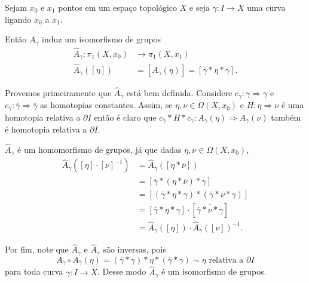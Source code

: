 \begin{prop}
    Sejam $x_0$ e $x_1$ pontos em um espaço topológico $X$ e seja $\gamma: I \to X$ uma curva ligando $x_0$ a $x_1$.
    
    Então $A_{\gamma}$ induz um isomorfismo de grupos \begin{align*}
        \hat{A}_{\gamma}: \pi_1(X,x_0)&\to \pi_1(X,x_1)\\
        \hat{A}_{\gamma}([\eta]) &= [A_{\gamma}(\eta)] = [\overline{\gamma} * \eta * \gamma].
    \end{align*}

    \begin{dem}
        Provemos primeiramente que $\hat{A}_{\gamma}$ está bem definida. Considere $c_{\gamma}: \gamma \Rightarrow \gamma$ e $c_{\overline{\gamma}}: \overline{\gamma} \Rightarrow \overline{\gamma}$ as homotopias constantes. Assim, se $\eta, \nu \in \Omega(X,x_0)$ e $H: \eta \Rightarrow \nu$ é uma homotopia relativa a $\partial I$ então é claro que $c_{\overline{\gamma}}*H*c_{\gamma}: A_{\gamma}(\eta) \Rightarrow A_{\gamma}(\nu)$ também é homotopia relativa a $\partial I$.

        $\hat{A}_{\gamma}$ é um homomorfismo de grupos, já que dadas $\eta, \nu \in \Omega(X,x_0)$,
        \begin{align*}
            \hat{A}_{\gamma}([\eta]\cdot[\nu]^{-1})
            &= \hat{A}_{\gamma}([\eta * \overline{\nu}])\\
            &= [\overline{\gamma} * (\eta * \overline{\nu}) * \gamma]\\
            &= [(\overline{\gamma} * \eta * \gamma)*(\overline{\gamma} * \overline{\nu} * \gamma)]\\
            &= [\overline{\gamma} * \eta * \gamma]\cdot[\overline{\overline{\gamma} * \nu * \gamma}]\\
            &= \hat{A}_{\gamma}([\eta]) \cdot \hat{A}_{\gamma}([\nu])^{-1}.
        \end{align*}
        
        Por fim, note que $\hat{A}_{\gamma}$ e $\hat{A}_{\overline{\gamma}}$ são inversas, pois \[A_{\gamma} \circ A_{\overline{\gamma}}(\eta) = (\overline{\gamma} * \gamma) * \eta * (\overline{\gamma} * \gamma) \sim \eta\text{ relativa a }\partial I\]
        para toda curva $\gamma: I \to X$. Desse modo $\hat{A}_{\gamma}$ é um isomorfismo de grupos.
    \end{dem}
\end{prop}

